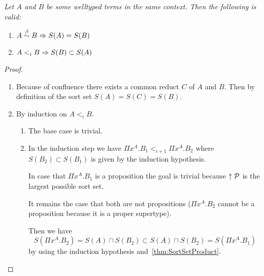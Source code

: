 \begin{theorem}
    \label{thm:SortSetsSubtype}
    \emph{Let $A$ and $B$ be some welltyped terms in the same context. Then the
    following is valid:}
    \begin{enumerate}

        \item $A \stackrel{\beta}{\sim} B \Rightarrow S(A) = S(B)$

        \item $A <_i B \Rightarrow S(B) \subset S(A)$
    \end{enumerate}
    \begin{proof}

        \ \begin{enumerate}

            \item Because of confluence there exists a common reduct $C$ of $A$
                and $B$. Then by definition of the sort set $S(A) = S(C) =
                S(B)$.

            \item By induction on $ A <_i B$.
                \begin{enumerate}
                    \item The base case is trivial.

                    \item In the induction step we have $\Pi x^A . B_1 <_{i+1}
                        \Pi x^A. B_2$ where $S(B_2) \subset S(B_1)$ is given by
                        the induction hypothesis.

                        In case that $\Pi x^A. B_1$ is a proposition the goal is
                        trivial because ${\uparrow {\cal P}}$ is the largest possible
                        sort set.

                        It remains the case that both are not propositions ($\Pi
                        x^A. B_2$ cannot be a proposition because it is a proper
                        supertype).

                        Then we have
                        $$
                        S(\Pi x^A. B_2) = S(A) \cap S(B_2) \subset S(A) \cap
                        S(B_2) = S(\Pi x^A. B_1)
                        $$
                        by using the induction hypothesis
                        and~\ref{thm:SortSetProduct}.
                \end{enumerate}
        \end{enumerate}
    \end{proof}
\end{theorem}






